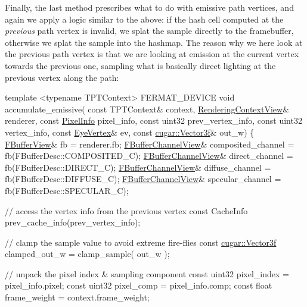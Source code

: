  \begin{DoxyParagraph}{}
Finally, the last method prescribes what to do with emissive path vertices, and again we apply a logic similar to the above\+: if the hash cell computed at the {\itshape previous} path vertex is invalid, we splat the sample directly to the framebuffer, otherwise we splat the sample into the hashmap. The reason why we here look at the previous path vertex is that we are looking at emission at the current vertex towards the previous one, sampling what is basically direct lighting at the previous vertex along the path\+:
\end{DoxyParagraph}

\begin{DoxyCodeInclude}
    \textcolor{keyword}{template} <\textcolor{keyword}{typename} TPTContext>
    FERMAT\_DEVICE
    \textcolor{keywordtype}{void} accumulate\_emissive(
        \textcolor{keyword}{const} TPTContext&           context,
              \hyperlink{struct_rendering_context_view}{RenderingContextView}& renderer,
        \textcolor{keyword}{const} \hyperlink{union_pixel_info}{PixelInfo}                pixel\_info,
        \textcolor{keyword}{const} uint32                prev\_vertex\_info,
        \textcolor{keyword}{const} uint32                vertex\_info,
        \textcolor{keyword}{const} \hyperlink{struct_eye_vertex}{EyeVertex}&           ev,
        \textcolor{keyword}{const} \hyperlink{structcugar_1_1_vector}{cugar::Vector3f}&       out\_w)
    \{
        \hyperlink{struct_f_buffer_view}{FBufferView}& fb = renderer.fb;
        \hyperlink{struct_f_buffer_channel_view}{FBufferChannelView}& composited\_channel = fb(FBufferDesc::COMPOSITED\_C);
        \hyperlink{struct_f_buffer_channel_view}{FBufferChannelView}& direct\_channel     = fb(FBufferDesc::DIRECT\_C);
        \hyperlink{struct_f_buffer_channel_view}{FBufferChannelView}& diffuse\_channel    = fb(FBufferDesc::DIFFUSE\_C);
        \hyperlink{struct_f_buffer_channel_view}{FBufferChannelView}& specular\_channel   = fb(FBufferDesc::SPECULAR\_C);

        \textcolor{comment}{// access the vertex info from the previous vertex}
        \textcolor{keyword}{const} CacheInfo prev\_cache\_info(prev\_vertex\_info);

        \textcolor{comment}{// clamp the sample value to avoid extreme fire-flies}
        \textcolor{keyword}{const} \hyperlink{structcugar_1_1_vector}{cugar::Vector3f} clamped\_out\_w = clamp\_sample( out\_w );

        \textcolor{comment}{// unpack the pixel index & sampling component}
        \textcolor{keyword}{const} uint32 pixel\_index = pixel\_info.pixel;
        \textcolor{keyword}{const} uint32 pixel\_comp  = pixel\_info.comp;
        \textcolor{keyword}{const} \textcolor{keywordtype}{float} frame\_weight = context.frame\_weight;


\end{DoxyCodeInclude}
